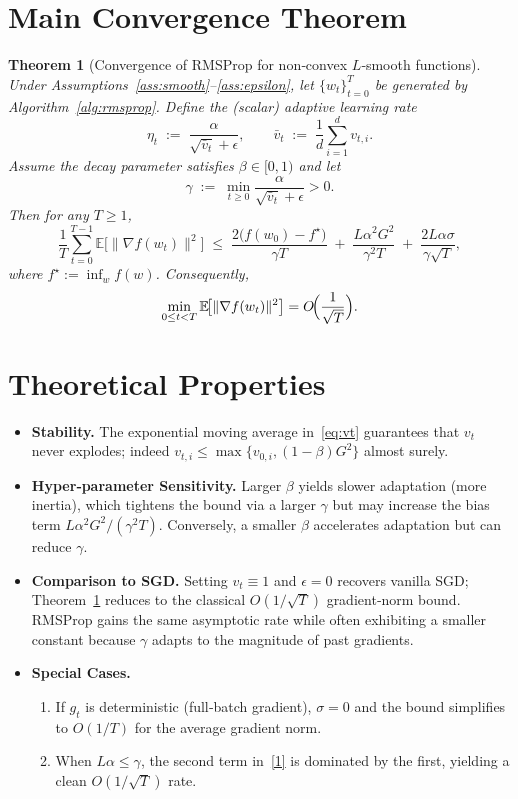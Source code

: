 \documentclass[11pt]{article}
\newtheorem{theorem}{Theorem}
\newcommand{\E}{\mathbb{E}}
\begin{document}
\section*{Main Convergence Theorem}
\begin{theorem}[Convergence of RMSProp for non‑convex $L$‑smooth functions]\label{thm:main}
Under Assumptions~\ref{ass:smooth}–\ref{ass:epsilon}, let $\{w_t\}_{t=0}^{T}$ be generated by Algorithm~\ref{alg:rmsprop}.  
Define the (scalar) adaptive learning rate
\[
\eta_t \;:=\; \frac{\alpha}{\sqrt{\bar v_t}+\epsilon},
\qquad 
\bar v_t \;:=\;\frac{1}{d}\sum_{i=1}^{d} v_{t,i}.
\]
Assume the decay parameter satisfies $\beta\in[0,1)$ and let 
\[
\gamma \;:=\; \min_{t\ge0}\frac{\alpha}{\sqrt{\bar v_t}+\epsilon}>0.
\]
Then for any $T\ge1$,
\[
\frac{1}{T}\sum_{t=0}^{T-1}\E\!\big[\|\nabla f(w_t)\|^2\big]
\;\le\;
\frac{2\big(f(w_0)-f^\star\big)}{\gamma T}
\;+\;
\frac{L\alpha^2 G^2}{\gamma^2 T}
\;+\;
\frac{2L\alpha\sigma}{\gamma\sqrt{T}},
\tag{1}
\]
where $f^\star:=\inf_{w}f(w)$. Consequently,
\[
\min_{0\le t<T}\E\!\big[\|\nabla f(w_t)\|^2\big]
= O\!\Bigl(\frac{1}{\sqrt{T}}\Bigr).
\]
\end{theorem}

\section*{Theoretical Properties}
\begin{itemize}[leftmargin=*]
\item \textbf{Stability.} The exponential moving average in~\eqref{eq:vt} guarantees that $v_t$ never explodes; indeed $v_{t,i}\le\max\{v_{0,i},(1-\beta)G^2\}$ almost surely.
\item \textbf{Hyper‑parameter Sensitivity.} Larger $\beta$ yields slower adaptation (more inertia), which tightens the bound via a larger $\gamma$ but may increase the bias term $L\alpha^2G^2/(\gamma^2T)$. Conversely, a smaller $\beta$ accelerates adaptation but can reduce $\gamma$.
\item \textbf{Comparison to SGD.} Setting $v_t\equiv 1$ and $\epsilon=0$ recovers vanilla SGD; Theorem~\ref{thm:main} reduces to the classical $O(1/\sqrt{T})$ gradient‑norm bound. RMSProp gains the same asymptotic rate while often exhibiting a smaller constant because $\gamma$ adapts to the magnitude of past gradients.
\item \textbf{Special Cases.}
\begin{enumerate}
    \item If $g_t$ is deterministic (full‑batch gradient), $\sigma=0$ and the bound simplifies to $O(1/T)$ for the average gradient norm.
    \item When $L\alpha\le\gamma$, the second term in~\eqref{1} is dominated by the first, yielding a clean $O(1/\sqrt{T})$ rate.
\end{enumerate}
\end{itemize}
\end{document}

